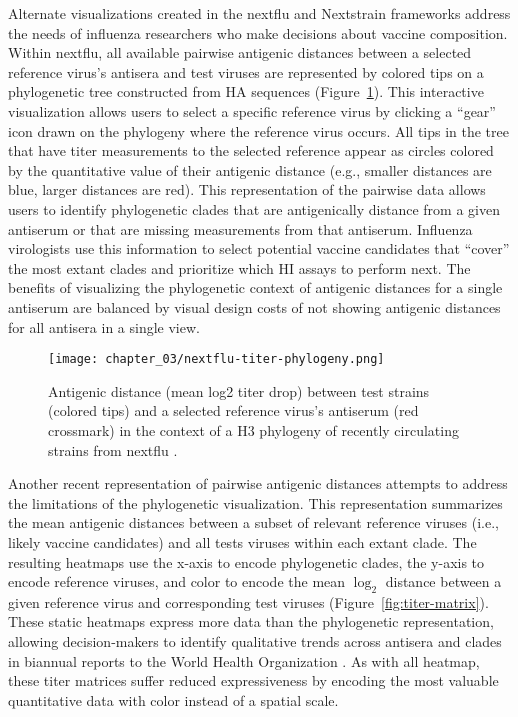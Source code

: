 Alternate visualizations created in the nextflu \citep{Neher:2015jr} and Nextstrain \citep{Hadfield2018} frameworks address the needs of influenza researchers who make decisions about vaccine composition.
Within nextflu, all available pairwise antigenic distances between a selected reference virus's antisera and test viruses are represented by colored tips on a phylogenetic tree constructed from HA sequences (Figure~\ref{fig:titer-phylogeny}).
This interactive visualization allows users to select a specific reference virus by clicking a ``gear'' icon drawn on the phylogeny where the reference virus occurs.
All tips in the tree that have titer measurements to the selected reference appear as circles colored by the quantitative value of their antigenic distance (e.g., smaller distances are blue, larger distances are red).
This representation of the pairwise data allows users to identify phylogenetic clades that are antigenically distance from a given antiserum or that are missing measurements from that antiserum.
Influenza virologists use this information to select potential vaccine candidates that ``cover'' the most extant clades and prioritize which HI assays to perform next.
The benefits of visualizing the phylogenetic context of antigenic distances for a single antiserum are balanced by visual design costs of not showing antigenic distances for all antisera in a single view.

\begin{figure}
  \centering
  \texttt{[image: chapter\_03/nextflu-titer-phylogeny.png]}
  \caption{\label{fig:titer-phylogeny} Antigenic distance (mean log2 titer drop) between test strains (colored tips) and a selected reference virus's antiserum (red crossmark) in the context of a H3 phylogeny of recently circulating strains from nextflu \citep{Neher:2015jr}.}
\end{figure}

Another recent representation of pairwise antigenic distances attempts to address the limitations of the phylogenetic visualization.
This representation summarizes the mean antigenic distances between a subset of relevant reference viruses (i.e., likely vaccine candidates) and all tests viruses within each extant clade.
The resulting heatmaps use the x-axis to encode phylogenetic clades, the y-axis to encode reference viruses, and color to encode the mean $\log_{2}$ distance between a given reference virus and corresponding test viruses (Figure~\ref{fig:titer-matrix}).
These static heatmaps express more data than the phylogenetic representation, allowing decision-makers to identify qualitative trends across antisera and clades in biannual reports to the World Health Organization \citep{Bedford271114,Bedford780627}.
As with all heatmap, these titer matrices suffer reduced expressiveness by encoding the most valuable quantitative data with color instead of a spatial scale.

